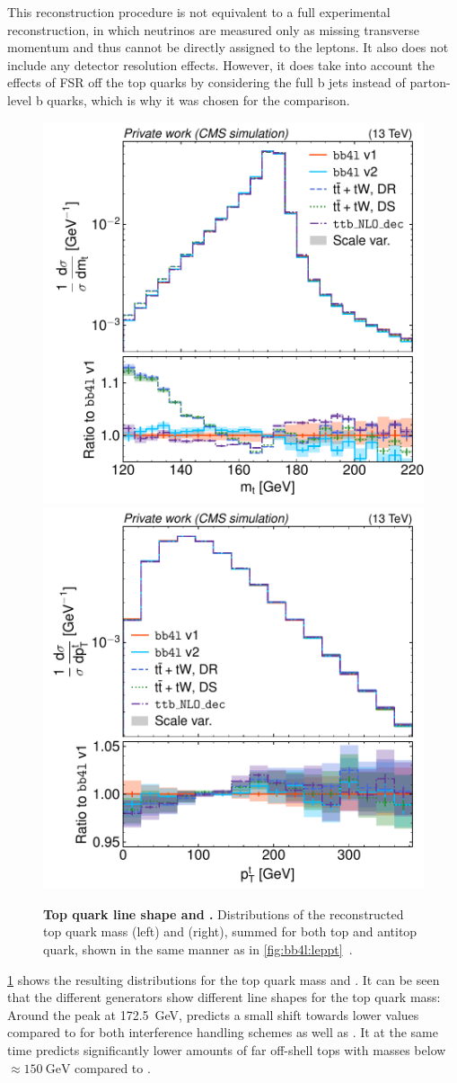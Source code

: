 This reconstruction procedure is not equivalent to a full experimental reconstruction, in which neutrinos are measured only as missing transverse momentum and thus cannot be directly assigned to the leptons. It also does not include any detector resolution effects. However, it does take into account the effects of FSR off the top quarks by considering the full b jets instead of parton-level b quarks, which is why it was chosen for the comparison.

\begin{figure}[tp]
    \centering
    \includegraphics[width=0.49 \textwidth]{figures/bb4l/generators/MC_TTBAR_DILEP_SPINDENSITY_anytop_mass.pdf}
    \hfill
    \includegraphics[width=0.49 \textwidth]{figures/bb4l/generators/MC_TTBAR_DILEP_SPINDENSITY_anytop_pt.pdf}
    \caption{\textbf{Top quark line shape and \pt.} Distributions of the reconstructed top quark mass (left) and \pt (right), summed for both top and antitop quark, shown in the same manner as in \cref{fig:bb4l:leppt}~\cite{CMS:NOTE-2023-015}.}
    \label{fig:bb4l:top}
\end{figure}

\cref{fig:bb4l:top} shows the resulting distributions for the top quark mass and \pt. It can be seen that the different generators show different line shapes for the top quark mass: Around the peak at \SI{172.5}{\GeV}, \bbfourl predicts a small shift towards lower values compared to \tttWsum for both interference handling schemes as well as \ttb. It at the same time predicts significantly lower amounts of far off-shell tops with masses below $\approx \SI{150}{\GeV}$ compared to \tttWsum. 

